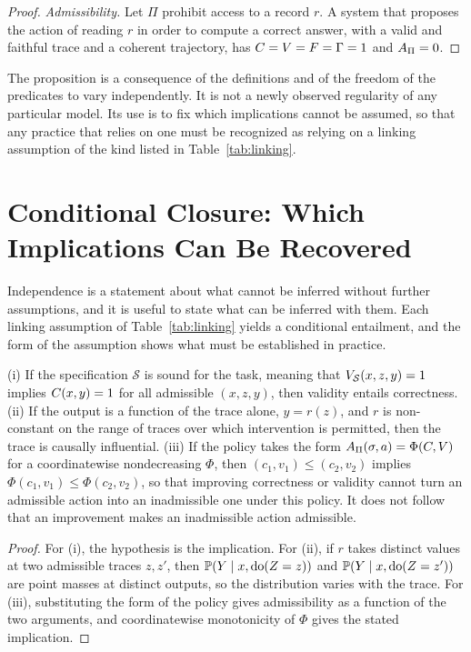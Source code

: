 \begin{proof}
\emph{Admissibility.} Let $\Pi$ prohibit access to a record $r$. A system that proposes the action of reading $r$ in order to compute a correct answer, with a valid and faithful trace and a coherent trajectory, has $C=V=F=\Gamma=1$ and $A_\Pi=0$.
\end{proof}

\begin{remark}
The proposition is a consequence of the definitions and of the freedom of the predicates to vary independently. It is not a newly observed regularity of any particular model. Its use is to fix which implications cannot be assumed, so that any practice that relies on one must be recognized as relying on a linking assumption of the kind listed in Table~\ref{tab:linking}.
\end{remark}

\section{Conditional Closure: Which Implications Can Be Recovered}

Independence is a statement about what cannot be inferred without further assumptions, and it is useful to state what can be inferred with them. Each linking assumption of Table~\ref{tab:linking} yields a conditional entailment, and the form of the assumption shows what must be established in practice.

\begin{proposition}\label{prop:conditional}
(i) If the specification $\mathcal S$ is sound for the task, meaning that $V_{\mathcal S}(x,z,y)=1$ implies $C(x,y)=1$ for all admissible $(x,z,y)$, then validity entails correctness. (ii) If the output is a function of the trace alone, $y=r(z)$, and $r$ is non-constant on the range of traces over which intervention is permitted, then the trace is causally influential. (iii) If the policy takes the form $A_\Pi(\sigma,a)=\Phi(C,V)$ for a coordinatewise nondecreasing $\Phi$, then $(c_1,v_1)\le(c_2,v_2)$ implies $\Phi(c_1,v_1)\le\Phi(c_2,v_2)$, so that improving correctness or validity cannot turn an admissible action into an inadmissible one under this policy. It does not follow that an improvement makes an inadmissible action admissible.
\end{proposition}

\begin{proof}
For (i), the hypothesis is the implication. For (ii), if $r$ takes distinct values at two admissible traces $z,z'$, then $\mathbb{P}(Y\mid x,\operatorname{do}(Z=z))$ and $\mathbb{P}(Y\mid x,\operatorname{do}(Z=z'))$ are point masses at distinct outputs, so the distribution varies with the trace. For (iii), substituting the form of the policy gives admissibility as a function of the two arguments, and coordinatewise monotonicity of $\Phi$ gives the stated implication.
\end{proof}

